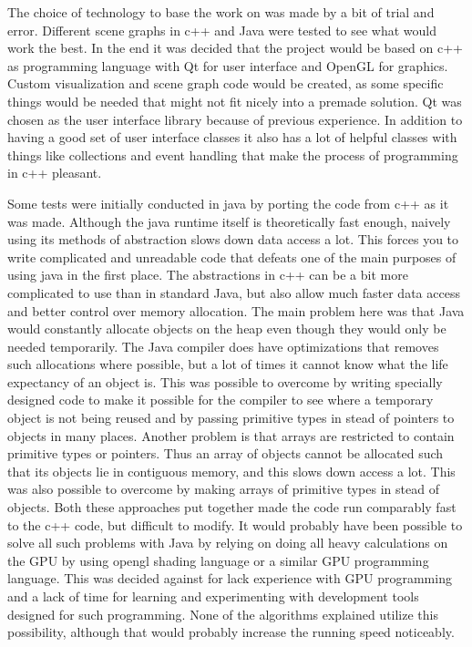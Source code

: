 \documentclass[a4paper,12pt]{report}
\begin{document}
The choice of technology to base the work on was made by a bit of trial and error. Different scene graphs in c++ and Java were tested to see what would work the best. In the end it was decided that the project would be based on c++ as programming language with Qt for user interface and OpenGL for graphics. Custom visualization and scene graph code would be created, as some specific things would be needed that might not fit nicely into a premade solution. Qt was chosen as the user interface library because of previous experience. In addition to having a good set of user interface classes it also has a lot of helpful classes with things like collections and event handling that make the process of programming in c++ pleasant.

Some tests were initially conducted in java by porting the code from c++ as it was made. Although the java runtime itself is theoretically fast enough, naively using its methods of abstraction slows down data access a lot. This forces you to write complicated and unreadable code that defeats one of the main purposes of using java in the first place. The abstractions in c++ can be a bit more complicated to use than in standard Java, but also allow much faster data access and better control over memory allocation. The main problem here was that Java would constantly allocate objects on the heap even though they would only be needed temporarily. The Java compiler does have optimizations that removes such allocations where possible, but a lot of times it cannot know what the life expectancy of an object is. This was possible to overcome by writing specially designed code to make it possible for the compiler to see where a temporary object is not being reused and by passing primitive types in stead of pointers 
to objects in many places. Another problem is that arrays are restricted to contain primitive types or pointers. Thus an array of objects cannot be allocated such that its objects lie in contiguous memory, and this slows down access a lot. This was also possible to overcome by making arrays of primitive types in stead of objects. Both these approaches put together made the code run comparably fast to the c++ code, but difficult to modify. It would probably have been possible to solve all such problems with Java by relying on doing all heavy calculations on the GPU by using opengl shading language or a similar GPU programming language. This was decided against for lack experience with GPU programming and a lack of time for learning and experimenting with development tools designed for such programming. None of the algorithms explained utilize this possibility, although that would probably increase the 
running speed noticeably.
\end{document}
